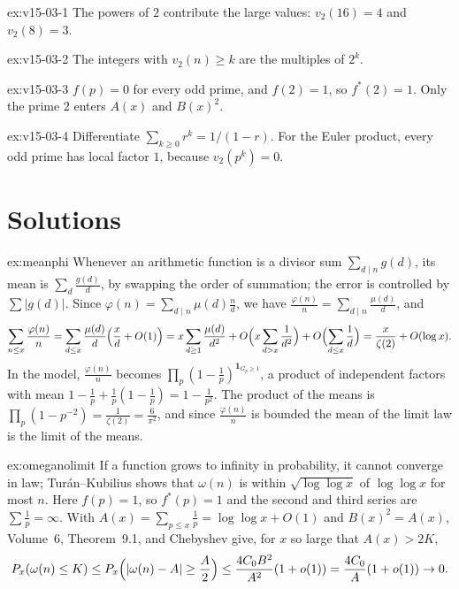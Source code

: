 \begin{hint}{ex:v15-03-1}
The powers of \(2\) contribute the large values: \(v_2(16)=4\) and \(v_2(8)=3\).
\end{hint}

\begin{hint}{ex:v15-03-2}
The integers with \(v_2(n)\ge k\) are the multiples of \(2^k\).
\end{hint}

\begin{hint}{ex:v15-03-3}
\(f(p)=0\) for every odd prime, and \(f(2)=1\), so \(f^*(2)=1\). Only the prime \(2\) enters \(A(x)\) and \(B(x)^2\).
\end{hint}

\begin{hint}{ex:v15-03-4}
Differentiate \(\sum_{k\ge0}r^k=1/(1-r)\). For the Euler product, every odd prime has local factor \(1\), because \(v_2(p^k)=0\).
\end{hint}

\section{Solutions}

\begin{solution}{ex:meanphi}
\idea Whenever an arithmetic function is a divisor sum $\sum_{d\mid n}g(d)$, its mean is $\sum_d\frac{g(d)}d$, by swapping the order of summation; the error is controlled by $\sum|g(d)|$.
\writeup Since $\varphi(n)=\sum_{d\mid n}\mu(d)\frac nd$, we have $\frac{\varphi(n)}n=\sum_{d\mid n}\frac{\mu(d)}d$, and
\[
\sum_{n\le x}\frac{\varphi(n)}n=\sum_{d\le x}\frac{\mu(d)}d\Bigl(\frac xd+O(1)\Bigr)=x\sum_{d\ge1}\frac{\mu(d)}{d^2}+O\Bigl(x\sum_{d>x}\frac1{d^2}\Bigr)+O\Bigl(\sum_{d\le x}\frac1d\Bigr)=\frac x{\zeta(2)}+O(\log x).
\]
In the model, $\frac{\varphi(n)}n$ becomes $\prod_p(1-\frac1p)^{\mathbf 1_{G_p\ge1}}$, a product of independent factors with mean $1-\frac1p+\frac1p(1-\frac1p)=1-\frac1{p^2}$. The product of the means is $\prod_p(1-p^{-2})=\frac1{\zeta(2)}=\frac6{\pi^2}$, and since $\frac{\varphi(n)}n$ is bounded the mean of the limit law is the limit of the means.
\end{solution}

\begin{solution}{ex:omeganolimit}
\idea If a function grows to infinity in probability, it cannot converge in law; Tur\'an--Kubilius shows that $\omega(n)$ is within $\sqrt{\log\log x}$ of $\log\log x$ for most $n$.
\writeup Here $f(p)=1$, so $f^*(p)=1$ and the second and third series are $\sum\frac1p=\infty$. With $A(x)=\sum_{p\le x}\frac1p=\log\log x+O(1)$ and $B(x)^2=A(x)$, Volume~6, Theorem~9.1, and Chebyshev give, for $x$ so large that $A(x)>2K$,
\[
P_x(\omega(n)\le K)\le P_x\Bigl(|\omega(n)-A|\ge\frac A2\Bigr)\le\frac{4C_0B^2}{A^2}(1+o(1))=\frac{4C_0}{A}(1+o(1))\to0.
\]
\end{solution}

